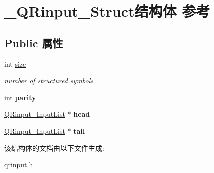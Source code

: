 \hypertarget{struct___q_rinput___struct}{\section{\-\_\-\-Q\-Rinput\-\_\-\-Struct结构体 参考}
\label{struct___q_rinput___struct}
}
\subsection*{Public 属性}
\begin{DoxyCompactItemize}
\item 
\hypertarget{struct___q_rinput___struct_ae1b68ea889ffbcf415ed531f54bd189e}{int \hyperlink{struct___q_rinput___struct_ae1b68ea889ffbcf415ed531f54bd189e}{size}}\label{struct___q_rinput___struct_ae1b68ea889ffbcf415ed531f54bd189e}

\begin{DoxyCompactList}\small\item\em number of structured symbols \end{DoxyCompactList}\item 
\hypertarget{struct___q_rinput___struct_a5877234dae241a78499e164b33fb4fcb}{int {\bfseries parity}}\label{struct___q_rinput___struct_a5877234dae241a78499e164b33fb4fcb}

\item 
\hypertarget{struct___q_rinput___struct_a14a237b726b7aad7dcaaccff2a864b5f}{\hyperlink{struct___q_rinput___input_list}{Q\-Rinput\-\_\-\-Input\-List} $\ast$ {\bfseries head}}\label{struct___q_rinput___struct_a14a237b726b7aad7dcaaccff2a864b5f}

\item 
\hypertarget{struct___q_rinput___struct_a38368e551a8aa90156aceae525c512bb}{\hyperlink{struct___q_rinput___input_list}{Q\-Rinput\-\_\-\-Input\-List} $\ast$ {\bfseries tail}}\label{struct___q_rinput___struct_a38368e551a8aa90156aceae525c512bb}

\end{DoxyCompactItemize}


该结构体的文档由以下文件生成\-:\begin{DoxyCompactItemize}
\item 
qrinput.\-h\end{DoxyCompactItemize}
